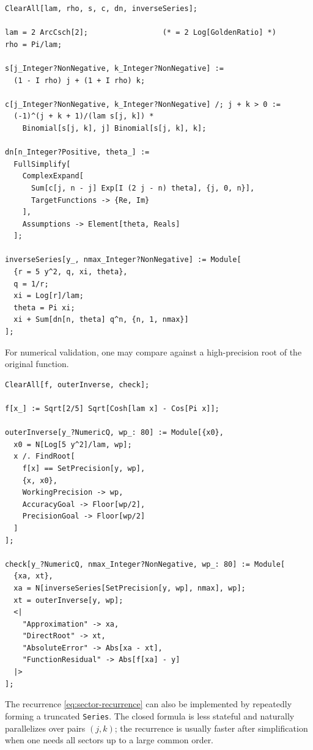 \documentclass[11pt,oneside]{article}
\numberwithin{equation}{section}
\theoremstyle{plain}
\theoremstyle{definition}
\theoremstyle{remark}
\begin{document}
\begin{lstlisting}[caption={Closed coefficients and truncated inverse transseries.},label={lst:wl-coeff}]
ClearAll[lam, rho, s, c, dn, inverseSeries];

lam = 2 ArcCsch[2];                 (* = 2 Log[GoldenRatio] *)
rho = Pi/lam;

s[j_Integer?NonNegative, k_Integer?NonNegative] :=
  (1 - I rho) j + (1 + I rho) k;

c[j_Integer?NonNegative, k_Integer?NonNegative] /; j + k > 0 :=
  (-1)^(j + k + 1)/(lam s[j, k]) *
    Binomial[s[j, k], j] Binomial[s[j, k], k];

dn[n_Integer?Positive, theta_] :=
  FullSimplify[
    ComplexExpand[
      Sum[c[j, n - j] Exp[I (2 j - n) theta], {j, 0, n}],
      TargetFunctions -> {Re, Im}
    ],
    Assumptions -> Element[theta, Reals]
  ];

inverseSeries[y_, nmax_Integer?NonNegative] := Module[
  {r = 5 y^2, q, xi, theta},
  q = 1/r;
  xi = Log[r]/lam;
  theta = Pi xi;
  xi + Sum[dn[n, theta] q^n, {n, 1, nmax}]
];
\end{lstlisting}

For numerical validation, one may compare against a high-precision root of
the original function.

\begin{lstlisting}[caption={Direct outer inverse and residual check.},label={lst:wl-root}]
ClearAll[f, outerInverse, check];

f[x_] := Sqrt[2/5] Sqrt[Cosh[lam x] - Cos[Pi x]];

outerInverse[y_?NumericQ, wp_: 80] := Module[{x0},
  x0 = N[Log[5 y^2]/lam, wp];
  x /. FindRoot[
    f[x] == SetPrecision[y, wp],
    {x, x0},
    WorkingPrecision -> wp,
    AccuracyGoal -> Floor[wp/2],
    PrecisionGoal -> Floor[wp/2]
  ]
];

check[y_?NumericQ, nmax_Integer?NonNegative, wp_: 80] := Module[
  {xa, xt},
  xa = N[inverseSeries[SetPrecision[y, wp], nmax], wp];
  xt = outerInverse[y, wp];
  <|
    "Approximation" -> xa,
    "DirectRoot" -> xt,
    "AbsoluteError" -> Abs[xa - xt],
    "FunctionResidual" -> Abs[f[xa] - y]
  |>
];
\end{lstlisting}

The recurrence \cref{eq:sector-recurrence} can also be implemented by
repeatedly forming a truncated \texttt{Series}.  The closed formula is less
stateful and naturally parallelizes over pairs \((j,k)\); the recurrence is
usually faster after simplification when one needs all sectors up to a large
common order.
\end{document}
